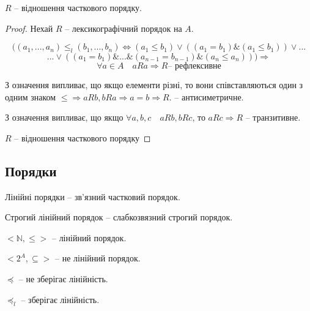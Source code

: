 \begin{claim}
    $R$ -- відношення часткового порядку.
\end{claim}
\begin{proof}
    Нехай $R$ -- лексикографічний порядок на $A$.
    
    $$\Big((a_1, ..., a_n) \leqslant_{l} (b_1, ..., b_n)
    \Leftrightarrow
        (a_1 \leqslant b_1)
        \vee ((a_1 = b_1) \& (a_1 \leqslant b_1))
        \vee ...$$
    $$...\vee ((a_1 = b_1) \& ... \& (a_{n-1} = b_{n-1}) \& (a_n \leqslant a_n)) \Big) \Rightarrow$$
    $$\forall a \in A \quad aRa \Rightarrow R \text{-- рефлексивне}$$
    
    З означення випливає, що якщо елементи різні, то
    вони співставляються один з одним знаком
    $\leqslant \Rightarrow aRb, bRa \Rightarrow a = b \Rightarrow R$.
    -- антисиметричне.
    
    З означення випливає, що якщо $\forall a, b, c \quad aRb, bRc$, то
    $aRc \Rightarrow R$ -- транзитивне.
    
    $R$ -- відношення часткового порядку
\end{proof}

\subsection{Порядки}

\begin{definition}
    Лінійні порядки -- зв'язний частковий порядок.
\end{definition}

\begin{definition}
    Строгий лінійний порядок -- слабкозвязний строгий порядок.
\end{definition}
\begin{example}
    $<\mathbb{N}, \leqslant>$ -- лінійний порядок.
\end{example}

\begin{example}
    $<2^{A}, \subseteq>$ -- не лінійний порядок.
\end{example}

\begin{example}
    $\preccurlyeq$ -- не зберігає лінійність.
\end{example}

\begin{example}
    $\preccurlyeq_{l}$ -- зберігає лінійність.
\end{example}

